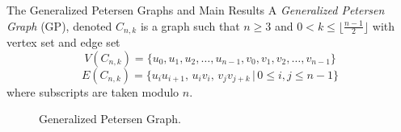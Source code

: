 \documentclass[final]{beamer}
\def\red{\color{red}}
\newcommand{\M}{\operatorname{M}}
\newcommand{\Z}{\operatorname{Z}}
\newcommand{\bit}{\begin{itemize}}
\begin{document}
\begin{frame}{}
\begin{columns}[t]
\begin{column}{0.48\linewidth}
\begin{block}{\red\Huge The Generalized Petersen Graphs and Main Results}
A {\color{blue}\emph{Generalized Petersen Graph}} (GP), denoted $C_{n,k}$
is a graph such that 
$n \geq 3$ and $0 < k \leq \lfloor \frac{n-1}{2} \rfloor$
with vertex set and edge set
\[
V(C_{n,k}) = \{u_0, u_1, u_2, \ldots, u_{n-1}, v_0, v_1,
v_2, \ldots,
v_{n-1} \}
\] 
\[
E(C_{n,k}) = \{u_iu_{i+1},\, u_iv_i,\, v_jv_{j+k} \, |\, 0 \leq
i,j
\leq n-1\}
\] where subscripts are taken modulo $n$.
\begin{figure}[h!] 
\centering
{}
\caption{Generalized Petersen Graph.}
\end{figure}


\end{block}


\end{column}
\end{columns}
\end{frame}
\end{document}

